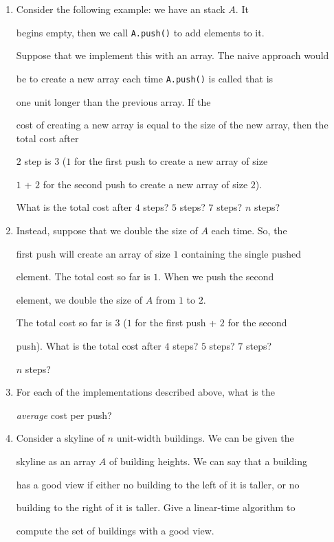 \documentclass{article}
\begin{document}
\begin{enumerate}[(1)]

    \item Consider the following example: we have an stack $A$.  It

        begins empty, then we call \texttt{A.push()} to add elements to it.

        Suppose that we implement this with an array.  The naive approach would

        be to create a new array each time \texttt{A.push()} is called that is

        one unit longer than the previous array.  If the

        cost of creating a new array is equal to the size of the new array, then the total cost after

        $2$ step is $3$ ($1$ for the first push to create a new array of size

        $1$ + $2$ for the second push to create a new array of size $2$).

        What is the total cost after $4$ steps?  $5$ steps? $7$ steps? $n$ steps?

        \vspace{1in}

    \item Instead, suppose that we double the size of $A$ each time.  So, the

        first push will create an array of size $1$ containing the single pushed

        element.  The total cost so far is $1$.  When we push the second

        element, we double the size of $A$ from $1$ to $2$.

        The total cost so far is $3$ ($1$ for the first push + $2$ for the second

        push).  What is the total cost after $4$ steps? $5$ steps? $7$ steps?

        $n$ steps?

        \vspace{1in}

    \item For each of the implementations described above, what is the

        \emph{average} cost per push?

    \pagebreak

    \item Consider a skyline of $n$ unit-width buildings.  We can be given the

        skyline as an array $A$ of building heights.  We can say that a building

        has a good view if either no building to the left of it is taller, or no

        building to the right of it is taller.  Give a linear-time algorithm to

        compute the set of buildings with a good view.

\end{enumerate}
\end{document}
